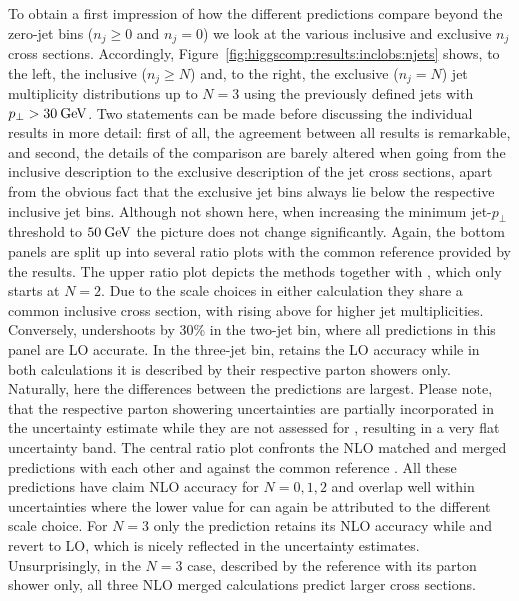 To obtain a first impression of how the different predictions 
compare beyond the zero-jet bins ($n_j\ge0$ and $n_j=0$) we 
look at the various inclusive and exclusive $n_j$ cross sections.
Accordingly, Figure~\ref{fig:higgscomp:results:inclobs:njets} shows,
to the left, the inclusive ($n_j\ge N$) and, to the right, the
exclusive ($n_j=N$) jet multiplicity distributions up to $N=3$ 
using the previously defined \antikt jets with $p_\perp>30\:\text{GeV}$. Two
statements can be made before discussing the individual results in
more detail: first of all, the agreement between all results is
remarkable, and second, the details of the comparison are barely
altered when going from the inclusive description to the exclusive
description of the jet cross sections, apart from the obvious fact
that the exclusive jet bins always lie below the respective inclusive
jet bins. Although not shown here, when increasing the minimum jet-$p_\perp$ 
threshold to $50\:\text{GeV}$ the picture does not change significantly. 
Again, the bottom panels are split up into several ratio
plots with the common reference provided by the \Powheg \NNLOPS
results. The upper ratio plot depicts the \NNLOPS methods together
with \Hej, which only starts at $N=2$. Due to the scale choices in either 
\NNLOPS calculation they share a common inclusive cross section, with 
\Sherpa rising above \Powheg for higher jet multiplicities. Conversely,
\Hej undershoots by 30\% in the two-jet bin, where all predictions in this 
panel are LO accurate. In the three-jet bin, \Hej retains the LO accuracy 
while in both \NNLOPS calculations it is described by their respective 
parton showers only. Naturally, here the differences between the \NNLOPS 
predictions are largest. Please note, that the respective parton showering 
uncertainties are partially incorporated in the \Sherpa \NNLOPS uncertainty 
estimate while they are not assessed for \Powheg, resulting in a very flat 
uncertainty band. The central ratio plot confronts the NLO
matched and merged predictions with each other and against the common reference 
\Powheg \NNLOPS. All these predictions have claim NLO accuracy for $N=0,1,2$ 
and overlap well within uncertainties where the lower value for \MGaMC can 
again be attributed to the different scale choice. For $N=3$ only the \Sherpa 
\MEPSatNLO prediction retains its NLO accuracy while \MGaMC and \Herwig 
revert to LO, which is nicely reflected in the uncertainty estimates. 
Unsurprisingly, in the $N=3$ case, described by the reference with its 
parton shower only, all three NLO merged calculations predict larger 
cross sections.

